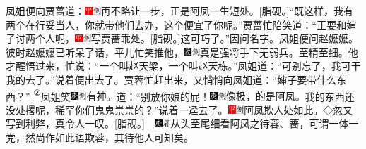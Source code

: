 凤姐便向贾蔷道：{{\includegraphics[width=3mm]{../Images/00002}\includegraphics[width=3mm]{../Images/00011}\footnotesize \kaishu 再不略让一步，正是阿凤一生短处。}{[}脂砚。{]}}``既这样，我有两个在行妥当人，你就带他们去办，这个便宜了你呢。''贾蔷忙陪笑道：``正要和婶子讨两个人呢，{{\includegraphics[width=3mm]{../Images/00002}\includegraphics[width=3mm]{../Images/00011}\footnotesize \kaishu 写贾蔷乖处。}{[}脂砚。{]}}这可巧了。''因问名字。凤姐便问赵嬷嬷。彼时赵嬷嬷已听呆了话，平儿忙笑推他，{\includegraphics[width=3mm]{../Images/00006}\includegraphics[width=3mm]{../Images/00011}\footnotesize \kaishu 真是强将手下无弱兵。至精至细。}他才醒悟过来，忙说：``一个叫赵天梁，一个叫赵天栋。''凤姐道：``可别忘了，我可干我的去了。''说着便出去了。贾蓉忙赶出来，又悄悄向凤姐道：``婶子要带什么东西？''
\href{../Text/part0020_split_000.html\#lnkback_2_a}{\textsuperscript{②}}凤姐笑{\includegraphics[width=3mm]{../Images/00004}\includegraphics[width=3mm]{../Images/00011}\footnotesize \kaishu 有神。}道：``别放你娘的屁！{\includegraphics[width=3mm]{../Images/00004}\includegraphics[width=3mm]{../Images/00011}\footnotesize \kaishu 像极，的是阿凤。}我的东西还没处撂呢，稀罕你们鬼鬼祟祟的？''说着一迳去了。{{\includegraphics[width=3mm]{../Images/00002}\includegraphics[width=3mm]{../Images/00011}\footnotesize \kaishu 阿凤欺人处如此。◇忽又写到利弊，真令人一叹。}{[}脂砚。{]}{　\includegraphics[width=3mm]{../Images/00004}\includegraphics[width=3mm]{../Images/00010}\footnotesize \kaishu 从头至尾细看阿凤之待蓉、蔷，可谓一体一党，然尚作如此语欺蓉，其待他人可知矣。}}

